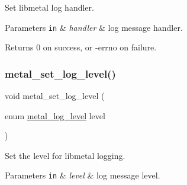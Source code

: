 Set libmetal log handler. 


\begin{DoxyParams}[1]{Parameters}
\mbox{\tt in}  & {\em handler} & log message handler. \\
\hline
\end{DoxyParams}
\begin{DoxyReturn}{Returns}
0 on success, or -\/errno on failure. 
\end{DoxyReturn}
\mbox{\label{group__logging_ga97d10ee76c920dd83b099f4cd1c26c0d}} 
\subsubsection{\texorpdfstring{metal\+\_\+set\+\_\+log\+\_\+level()}{metal\_set\_log\_level()}}
{\footnotesize\ttfamily void metal\+\_\+set\+\_\+log\+\_\+level (\begin{DoxyParamCaption}\item[{enum \hyperlink{group__logging_ga4ffa0f4a1339af510aca7f817ee36d82}{metal\+\_\+log\+\_\+level}}]{level }\end{DoxyParamCaption})}



Set the level for libmetal logging. 


\begin{DoxyParams}[1]{Parameters}
\mbox{\tt in}  & {\em level} & log message level. \\
\hline
\end{DoxyParams}
